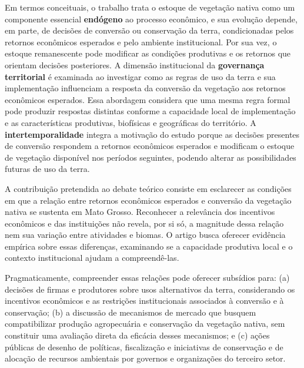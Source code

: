 Em termos conceituais, o trabalho trata o estoque de vegetação nativa como um componente essencial \textbf{endógeno} ao processo econômico, e sua evolução depende, em parte, de decisões de conversão ou conservação da terra, condicionadas pelos retornos econômicos esperados e pelo ambiente institucional. Por sua vez, o estoque remanescente pode modificar as condições produtivas e os retornos que orientam decisões posteriores. A dimensão institucional da \textbf{governança territorial} é examinada ao investigar como as regras de uso da terra e sua implementação influenciam a resposta da conversão da vegetação aos retornos econômicos esperados. Essa abordagem considera que uma mesma regra formal pode produzir respostas distintas conforme a capacidade local de implementação e as características produtivas, biofísicas e geográficas do território. A \textbf{intertemporalidade} integra a motivação do estudo porque as decisões presentes de conversão respondem a retornos econômicos esperados e modificam o estoque de vegetação disponível nos períodos seguintes, podendo alterar as possibilidades futuras de uso da terra. 

A contribuição pretendida ao debate teórico consiste em esclarecer as condições em que a relação entre retornos econômicos esperados e conversão da vegetação nativa se sustenta em Mato Grosso. Reconhecer a relevância dos incentivos econômicos e das instituições não revela, por si só, a magnitude dessa relação nem sua variação entre atividades e biomas. O artigo busca oferecer evidência empírica sobre essas diferenças, examinando se a capacidade produtiva local e o contexto institucional ajudam a compreendê-las.

Pragmaticamente, compreender essas relações pode oferecer subsídios para: (a) decisões de firmas e produtores sobre usos alternativos da terra, considerando os incentivos econômicos e as restrições institucionais associados à conversão e à conservação; (b) a discussão de mecanismos de mercado que busquem compatibilizar produção agropecuária e conservação da vegetação nativa, sem constituir uma avaliação direta da eficácia desses mecanismos; e (c) ações públicas de desenho de políticas, fiscalização e iniciativas de conservação e de alocação de recursos ambientais por governos e organizações do terceiro setor.

